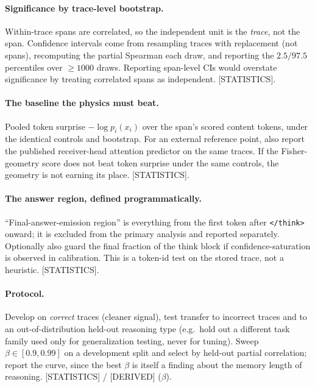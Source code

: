 \documentclass[11pt]{article}
\begin{document}
\paragraph{Significance by trace-level bootstrap.} Within-trace spans are correlated, so the independent unit is the \emph{trace}, not the span. Confidence intervals come from resampling traces with replacement (not spans), recomputing the partial Spearman each draw, and reporting the $2.5/97.5$ percentiles over $\geq 1000$ draws. Reporting span-level CIs would overstate significance by treating correlated spans as independent. \textsf{[STATISTICS]}.

\paragraph{The baseline the physics must beat.} Pooled token surprise $-\log p_i(x_i)$ over the span's scored content tokens, under the identical controls and bootstrap. For an external reference point, also report the published receiver-head attention predictor \cite{bogdan2025thoughtanchors} on the same traces. If the Fisher-geometry score does not beat token surprise under the same controls, the geometry is not earning its place. \textsf{[STATISTICS]}.

\paragraph{The answer region, defined programmatically.} ``Final-answer-emission region'' is everything from the first token after \texttt{</think>} onward; it is excluded from the primary analysis and reported separately. Optionally also guard the final fraction of the think block if confidence-saturation is observed in calibration. This is a token-id test on the stored trace, not a heuristic. \textsf{[STATISTICS]}.

\paragraph{Protocol.} Develop on \emph{correct} traces (cleaner signal), test transfer to incorrect traces and to an out-of-distribution held-out reasoning type (e.g.\ hold out a different task family used only for generalization testing, never for tuning). Sweep $\beta\in[0.9,0.99]$ on a development split and select by held-out partial correlation; report the curve, since the best $\beta$ is itself a finding about the memory length of reasoning. \textsf{[STATISTICS]} / \textsf{[DERIVED]} ($\beta$).
\end{document}
